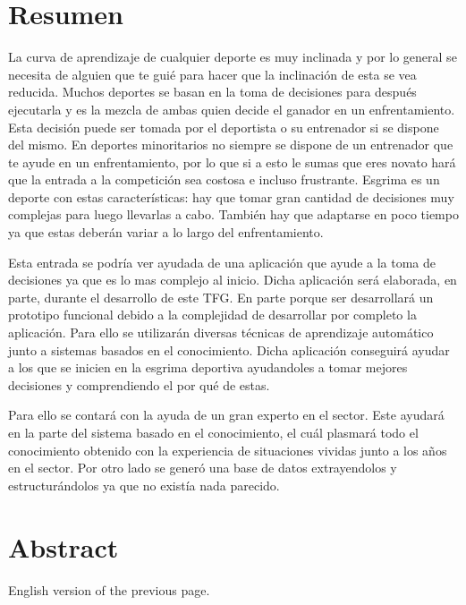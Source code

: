 \chapter{Resumen}

La curva de aprendizaje de cualquier deporte es muy inclinada y por lo general
se necesita de alguien que te guié para hacer que la inclinación de esta se vea
reducida. Muchos deportes se basan en la toma de decisiones para después ejecutarla
y es la mezcla de ambas quien decide el ganador en un enfrentamiento. Esta decisión
puede ser tomada por el deportista o su entrenador si se dispone del mismo.
En deportes minoritarios no siempre se dispone de un entrenador que te ayude
en un enfrentamiento, por lo que si a esto le sumas que eres novato hará
que la entrada a la competición sea costosa e incluso frustrante. Esgrima
es un deporte con estas características: hay que tomar gran cantidad de decisiones
muy complejas para luego llevarlas a cabo. También hay que adaptarse en poco tiempo
ya que estas deberán variar a lo largo del enfrentamiento.

Esta entrada se podría ver ayudada de una aplicación que ayude a la toma
de decisiones ya que es lo mas complejo al inicio. Dicha aplicación será elaborada,
en parte, durante el desarrollo de este TFG. En parte porque ser desarrollará un
prototipo funcional debido a la complejidad de desarrollar por completo la aplicación.
Para ello se utilizarán diversas técnicas de aprendizaje automático junto a sistemas
basados en el conocimiento. Dicha aplicación conseguirá ayudar a los que
se inicien en la esgrima deportiva ayudandoles a tomar mejores decisiones y comprendiendo
el por qué de estas.

Para ello se contará con la ayuda de un gran experto en el sector. Este ayudará
en la parte del sistema basado en el conocimiento, el cuál plasmará todo el conocimiento
obtenido con la experiencia de situaciones vividas junto a los años en el sector. Por
otro lado se generó una base de datos extrayendolos y estructurándolos ya que no
existía nada parecido.

\chapter{Abstract}

English version of the previous page.
